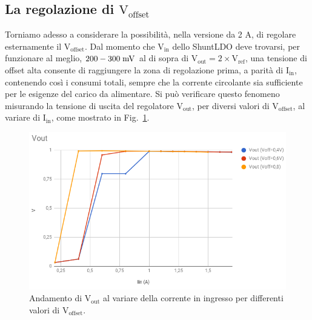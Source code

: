 \subsection{La regolazione di  $\mathrm{V_{offset}}$}
\label{Voffset}

Torniamo adesso a considerare la possibilità, nella versione da 2 A, di regolare esternamente il $\mathrm{V_{offset}}$. 
Dal momento che $\mathrm{V_{in}}$ dello ShuntLDO deve trovarsi, per funzionare al meglio, $200-300\rm \; mV$ al di sopra di $\mathrm{V_{out}=2\times V_{ref}}$, una tensione di offset alta consente di raggiungere la zona di regolazione prima, a parit\`a di $\mathrm{I_{in}}$, contenendo cos\`i i consumi totali, sempre che la corrente circolante sia sufficiente per le esigenze del carico da alimentare.
Si può verificare questo fenomeno misurando la tensione di uscita del regolatore $\mathrm{V_{out}}$, per diversi valori di $\mathrm{V_{offset}}$, al variare di $\mathrm{I_{in}}$, come mostrato in Fig.~\ref{VoutVsVoffset}.
\begin{figure}
\centering
\includegraphics[scale=.4]{Immagini/VoutVsVoffset}
\caption{Andamento di $\mathrm{V_{out}}$ al variare della corrente in ingresso per differenti valori di $\mathrm{V_{offset}}$.}
\label{VoutVsVoffset}
\end{figure}

